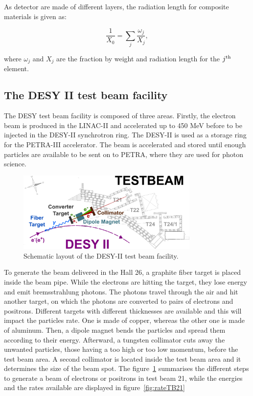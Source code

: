     As detector are made of different layers, the radiation length for composite materials is given as:

    \begin{equation}
      \frac{1}{X_{0}} = \sum_{j} \frac{\omega_{j}}{X_{j}},
    \end{equation}

   where $\omega_{j}$ and $X_{j}$ are the fraction by weight and radiation length for the $j^{\rm{th}}$ element.


    \subsection{The DESY II test beam facility}

    The \gls{DESY} test beam facility is composed of three areas.
    Firstly, the electron beam is produced in the LINAC-II and accelerated up to 450 MeV before to be injected in the DESY-II synchrotron ring.
    The DESY-II is used as a storage ring for the PETRA-III accelerator. 
    The beam is accelerated and stored until enough particles are available to be sent on to PETRA, where they are used for photon science.
    
    \begin{figure}[!h]
      \centering
      \includegraphics[width = 0.8\textwidth]{Pictures/X0/desy_tb-sketch.png}
      \caption{Schematic layout of the DESY-II test beam facility\cite{DESYII}.}
      \label{fig:desyTb-sketch}
    \end{figure}

    To generate the beam delivered in the Hall 26, a graphite fiber target is placed inside the beam pipe.
    While the electrons are hitting the target, they lose energy and emit bremsstrahlung photons.
    The photons travel through the air and hit another target, on which the photons are converted to pairs of electrons and positrons.
    Different targets with different thicknesses are available and this will impact the particles rate.
    One is made of copper, whereas the other one is made of aluminum.
    Then, a dipole magnet bends the particles and spread them according to their energy.
    Afterward, a tungsten collimator cuts away the unwanted particles, those having a too high or too low momentum, before the test beam area.
    A second collimator is located inside the test beam area and it determines the size of the beam spot.
    The figure~\ref{fig:desyTb-sketch} summarises the different steps to generate a beam of electrons or positrons in test beam 21, while the energies and the rates available are displayed in figure~\ref{fig:rateTB21}

